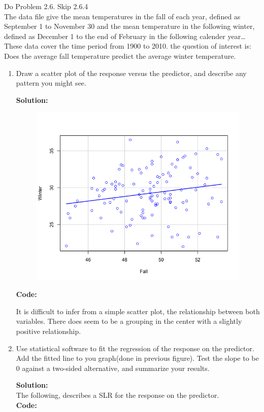 \documentclass[12pt]{article}
\makeatletter
\theoremstyle{homework}
\newenvironment{exercise}[1]
{\def\@currentlabel{#1}\exercisecore}
{\endexercisecore}
\newcommand{\localhead}[1]{\par\smallskip\noindent\textbf{#1}\nobreak\\}%
\newcommand\solution{\localhead{Solution:}}
\makeatother
\begin{document}
\begin{exercise}{1} Do Problem 2.6. Skip 2.6.4\\
  The data file give the mean temperatures in the fall of each year, 
  defined as September 1 to November 30 and the mean temperature in the following
  winter, defined as December 1 to the end of February in the following calender year\dots
  These data cover the time period from 1900 to 2010. the question of interest is: Does the 
  average fall temperature predict the average winter temperature. 
  \begin{enumerate}
    \item Draw a scatter plot of the response versus the predictor, and describe any pattern 
    you might see.
    \solution 
    \begin{figure}[H]
      \begin{center}
      \includegraphics[width = .75 \textwidth]{Rplot.png}
      \end{center}
    \end{figure}
        \textbf{Code:}
        \begin{center}
        
        \end{center} 
        It is difficult to infer from a simple scatter plot, the relationship between 
        both variables. There does seem to be a grouping in the center with a slightly positive 
        relationship. 
        \newpage

    \item Use statistical software to fit the regression of the response on the
    predictor. Add the fitted line to you graph(done in previous figure). Test the slope to be 0 against 
    a two-sided alternative, and summarize your results.\\
    \solution
    The following, describes a SLR for the response on the predictor. \\
    \textbf{Code:}
        \begin{center}
        
        \end{center} 
    

\end{enumerate}
\end{exercise}
\end{document}
